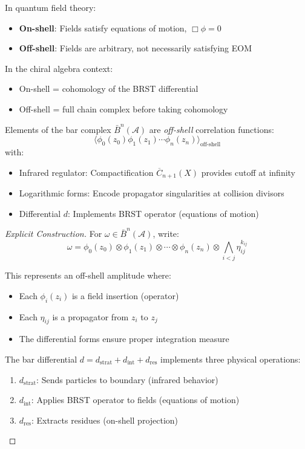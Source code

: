 \begin{definition}
In quantum field theory:
\begin{itemize}
\item \textbf{On-shell}: Fields satisfy equations of motion, $\Box \phi = 0$
\item \textbf{Off-shell}: Fields are arbitrary, not necessarily satisfying EOM
\end{itemize}

In the chiral algebra context:
\begin{itemize}
\item On-shell = cohomology of the BRST differential
\item Off-shell = full chain complex before taking cohomology
\end{itemize}
\end{definition}

\begin{theorem}[Bar = Off-Shell Amplitudes]
Elements of the bar complex $\bar{B}^n(\mathcal{A})$ are \emph{off-shell} 
correlation functions:
$$\langle \phi_0(z_0) \phi_1(z_1) \cdots \phi_n(z_n) \rangle_{\text{off-shell}}$$
with:
\begin{itemize}
\item Infrared regulator: Compactification $\overline{C}_{n+1}(X)$ provides 
cutoff at infinity
\item Logarithmic forms: Encode propagator singularities at collision divisors
\item Differential $d$: Implements BRST operator (equations of motion)
\end{itemize}
\end{theorem}

\begin{proof}[Explicit Construction]
For $\omega \in \bar{B}^n(\mathcal{A})$, write:
$$\omega = \phi_0(z_0) \otimes \phi_1(z_1) \otimes \cdots \otimes \phi_n(z_n) 
\otimes \bigwedge_{i<j} \eta_{ij}^{k_{ij}}$$

This represents an off-shell amplitude where:
\begin{itemize}
\item Each $\phi_i(z_i)$ is a field insertion (operator)
\item Each $\eta_{ij}$ is a propagator from $z_i$ to $z_j$
\item The differential forms ensure proper integration measure
\end{itemize}

The bar differential $d = d_{\text{strat}} + d_{\text{int}} + d_{\text{res}}$ 
implements three physical operations:
\begin{enumerate}
\item $d_{\text{strat}}$: Sends particles to boundary (infrared behavior)
\item $d_{\text{int}}$: Applies BRST operator to fields (equations of motion)
\item $d_{\text{res}}$: Extracts residues (on-shell projection)
\end{enumerate}
\end{proof}

